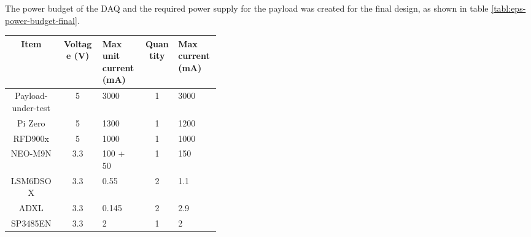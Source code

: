 \documentclass{report}
\begin{document}
The power budget of the DAQ and the required power supply for the payload was created for the final design, as shown in table \ref{tabl:eps-power-budget-final}.

\begin{table}[H]
  \centering
  \begin{tabular}{|c|c|L{0.2\linewidth}|c|L{0.2\linewidth}|}
    \hline
    \textbf{Item}                    & \textbf{Voltage (\si{\volt})} & \textbf{Max unit current (\si{\milli\ampere})} & \textbf{Quantity} & \textbf{Max current (\si{\milli\ampere})} \\
    \hline
    Payload-under-test               & 5                             & 3000                                           & 1                 & 3000                                      \\
    Pi Zero                          & 5                             & 1300 \cite{raspberry-pi-hardware-doc}          & 1                 & 1200                                      \\
    RFD900x                          & 5                             & 1000 \cite{rfdesign2020rfd900x}                & 1                 & 1000                                      \\
    NEO-M9N                          & 3.3                           & 100 + 50 \cite{ublox2023neo_m9n_datasheet}     & 1                 & 150                                       \\
    LSM6\-DSOX                       & 3.3                           & 0.55 \cite{lsm6dso-datasheet}                  & 2                 & 1.1                                       \\
    ADXL                        & 3.3                           & 0.145 \cite{analog2014adxl375}                 & 2                 & 2.9                                       \\
    SP3485EN                         & 3.3                           & 2 \cite{maxlinear2021sp3485}                   & 1                 & 2                                         \\

\end{tabular}
\end{table}
\end{document}
